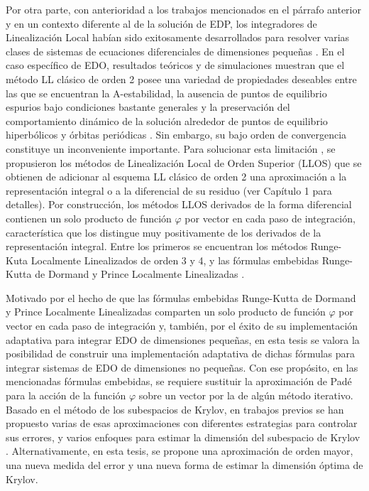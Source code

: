 Por otra parte, con anterioridad a los trabajos mencionados en el párrafo anterior y en un contexto diferente al de la solución de EDP, los integradores de Linealización Local habían sido exitosamente desarrollados para resolver varias clases de sistemas de ecuaciones diferenciales de dimensiones pequeñas \cite{jimenez2020}.
 En el caso específico de EDO, resultados teóricos y de simulaciones muestran que el método LL clásico de orden 2  \cite{pope1963exponential} posee una variedad de propiedades deseables entre las que se encuentran la A-estabilidad, la ausencia de puntos de equilibrio espurios bajo condiciones bastante generales y la preservación del comportamiento dinámico de la solución alrededor de puntos de equilibrio hiperbólicos y órbitas periódicas \cite{Jimenez02AMC}. Sin embargo, su bajo orden de convergencia constituye un inconveniente importante. Para solucionar esta limitación \cite{delaCruz06,delaCruz07,Jimenez13}, se propusieron los métodos de Linealización Local de Orden Superior (LLOS) que se obtienen de adicionar al esquema LL clásico de orden 2 una aproximación a la representación integral o a la diferencial de su residuo (ver Capítulo 1 para detalles). Por construcción, los métodos LLOS derivados de la forma diferencial contienen un solo  producto de función $\varphi$ por vector en cada paso de integración, característica que los distingue muy positivamente de los derivados de la representación integral. Entre los primeros se encuentran los métodos Runge-Kuta Localmente Linealizados de orden 3 y 4, y las fórmulas embebidas Runge-Kutta de Dormand y Prince Localmente Linealizadas \cite{delaCruz06,Jimenez13,Jimenez14AMC}.

Motivado por el hecho de que las fórmulas embebidas Runge-Kutta de Dormand y Prince Localmente Linealizadas comparten un solo producto de función $\varphi$ por vector en cada paso de integración y, también, por el éxito de su implementación adaptativa para integrar EDO de dimensiones pequeñas, en esta tesis se valora la posibilidad de construir una implementación adaptativa de dichas fórmulas para integrar sistemas de EDO de dimensiones no pequeñas. Con ese propósito, en las mencionadas fórmulas embebidas, se requiere sustituir la aproximación de Padé para la acción de la función $\varphi$ sobre un vector por la de algún método iterativo. Basado en el método de los subespacios de Krylov, en trabajos previos se han propuesto varias de esas aproximaciones con diferentes estrategias para controlar sus errores, y varios enfoques para estimar la dimensión del subespacio de Krylov \cite{hochbruck1998exponential,sidje1998expokit,niesen2012algorithm,gaudreault2018kiops}. Alternativamente, en esta tesis, se propone una aproximación de orden mayor, una nueva medida del error y una nueva forma de estimar la dimensión óptima de Krylov.

